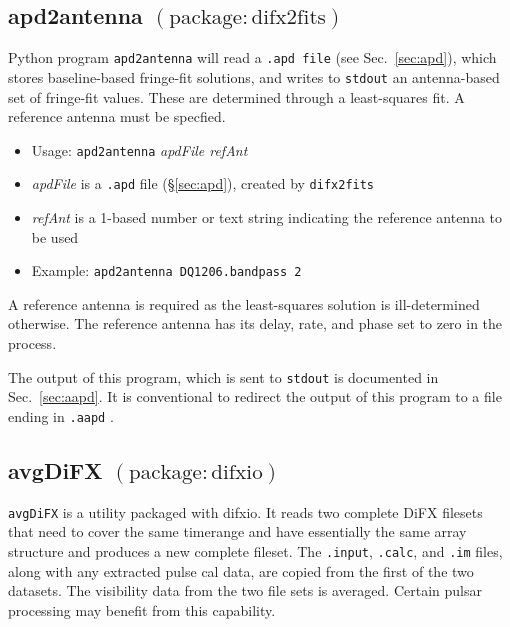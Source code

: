 \subsection{apd2antenna {\small $\mathrm{(package: difx2fits)}$}} \label{sec:apd2antenna}

Python program {\tt apd2antenna} will read a {\tt .apd file} (see Sec.~\ref{sec:apd}), which stores baseline-based fringe-fit solutions, and writes to {\tt stdout} an antenna-based set of fringe-fit values.
These are determined through a least-squares fit.
A reference antenna must be specfied.

\begin{itemize}
\item[] Usage: {\tt apd2antenna} {\em apdFile refAnt}
\item[] {\em apdFile} is a {\tt .apd} file (\S\ref{sec:apd}), created by {\tt difx2fits}
\item[] {\em refAnt} is a 1-based number or text string indicating the reference antenna to be used
\item[] Example: {\tt apd2antenna DQ1206.bandpass 2} 
\end{itemize}

A reference antenna is required as the least-squares solution is ill-determined otherwise.
The reference antenna has its delay, rate, and phase set to zero in the process.

The output of this program, which is sent to {\tt stdout} is documented in Sec.~\ref{sec:aapd}.
It is conventional to redirect the output of this program to a file ending in {\tt .aapd} .






\subsection{avgDiFX {\small $\mathrm{(package: difxio)}$}} \label{sec:avgDiFX}

{\tt avgDiFX} is a utility packaged with difxio.
It reads two complete DiFX filesets that need to cover the same timerange and have essentially the same array structure and produces a new complete fileset.
The {\tt .input}, {\tt .calc}, and {\tt .im} files, along with any extracted pulse cal data, are copied from the first of the two datasets.
The visibility data from the two file sets is averaged.
Certain pulsar processing may benefit from this capability.

